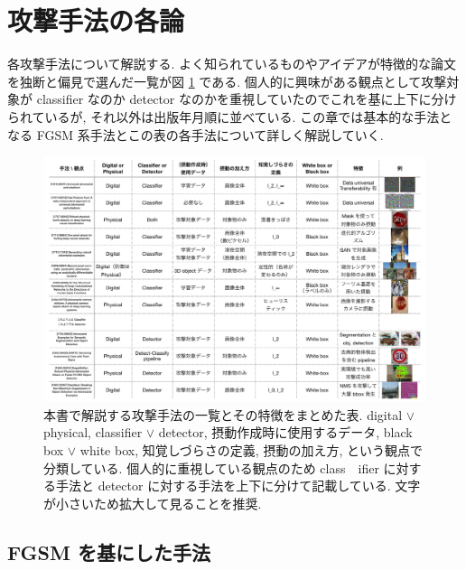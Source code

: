 \section{攻撃手法の各論}
\label{sec:attacks}
各攻撃手法について解説する.
よく知られているものやアイデアが特徴的な論文を独断と偏見で選んだ一覧が図 \ref{fig:attack-summary-table} である.
個人的に興味がある観点として攻撃対象が classifier なのか detector なのかを重視していたのでこれを基に上下に分けられているが, それ以外は出版年月順に並べている.
この章では基本的な手法となる FGSM 系手法とこの表の各手法について詳しく解説していく.
%
\begin{figure}[htbp]
\begin{center}
\includegraphics[width=16.0cm]{figures/attack-summary-table.pdf}
\end{center}
\caption{
本書で解説する攻撃手法の一覧とその特徴をまとめた表.
digital $\lor$ physical, classifier $\lor$ detector, 摂動作成時に使用するデータ, black box $\lor$ white box, 知覚しづらさの定義, 摂動の加え方, という観点で分類している.
個人的に重視している観点のため class　ifier に対する手法と detector に対する手法を上下に分けて記載している.
文字が小さいため拡大して見ることを推奨.
}
\label{fig:attack-summary-table}
\end{figure}
%



\subsection{FGSM を基にした手法}
\label{subsec:fgsm-based}


